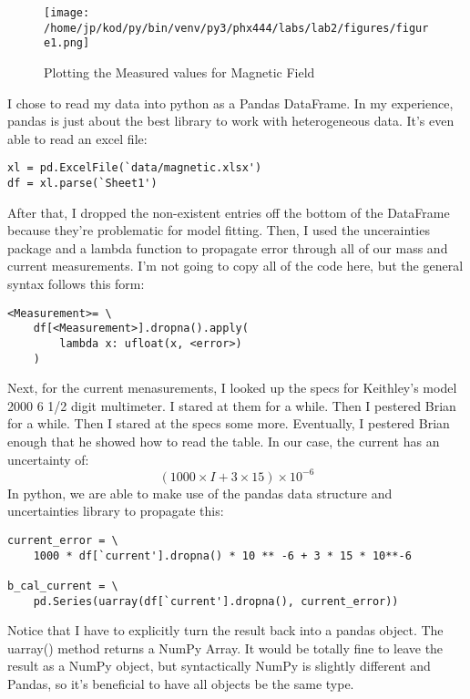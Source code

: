 \documentclass{article}
\begin{document}
\begin{figure}[H]
        \begin{center}
        \texttt{[image: /home/jp/kod/py/bin/venv/py3/phx444/labs/lab2/figures/figure1.png]}
        \caption{Plotting the Measured values for Magnetic Field}
        \label{fig:fig_1}
        \end{center}
\end{figure}
I chose to read my data into python as a Pandas DataFrame. In my experience,
pandas is just about the best library to work with heterogeneous data. It's
even able to read an excel file:
\begin{center}
\begin{minipage}[t]{.75\textwidth}
\begin{lstlisting}[frame=tlrb]
xl = pd.ExcelFile(`data/magnetic.xlsx')
df = xl.parse(`Sheet1')
\end{lstlisting}
\end{minipage}
\end{center}
After that, I dropped the non-existent entries off the bottom of the DataFrame
because they're problematic for model fitting. Then, I used the uncerainties
package and a lambda function to propagate error through all of our mass and 
current measurements. I'm not going to copy all of the code here, but the
general syntax follows this form:
\begin{center}
\begin{minipage}[t]{.75\textwidth}
\begin{lstlisting}[frame=tlrb]
<Measurement>= \
    df[<Measurement>].dropna().apply(
        lambda x: ufloat(x, <error>)
    )
\end{lstlisting}
\end{minipage}
\end{center}
Next, for the current menasurements, I looked up the specs for
Keithley's model 2000 6 1/2 digit multimeter. I stared at them for a while.
Then I pestered Brian for a while. Then I stared at the specs some more. Eventually, I
pestered Brian enough that he showed how to read the table. In our case, the current 
has an uncertainty of:
$$(1000 \times I + 3 \times 15) \times 10^{-6}$$
In python, we are able to make use of the pandas data structure and
uncertainties library to propagate this:
\begin{verbatim}
current_error = \
    1000 * df[`current'].dropna() * 10 ** -6 + 3 * 15 * 10**-6

b_cal_current = \
    pd.Series(uarray(df[`current'].dropna(), current_error))
\end{verbatim}
Notice that I have to explicitly turn the result back into a
pandas object. The uarray() method returns a NumPy Array. It would be totally
fine to leave the result as a NumPy object, but syntactically NumPy is slightly
different and Pandas, so it's beneficial to have all objects be the same type.
\end{document}
